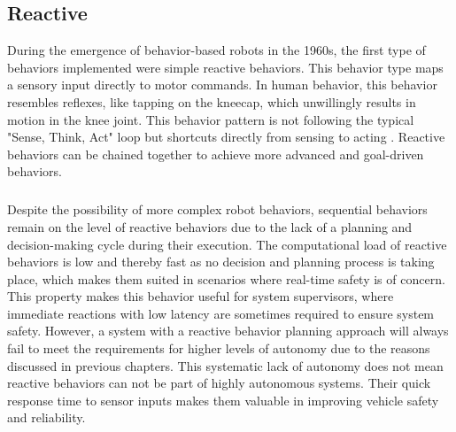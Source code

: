 \subsection{Reactive}
During the emergence of behavior-based robots in the 1960s, the first type of behaviors implemented were simple reactive behaviors. This behavior type maps a sensory input directly to motor commands. In human behavior, this behavior resembles reflexes, like tapping on the kneecap, which unwillingly results in motion in the knee joint. This behavior pattern is not following the typical "Sense, Think, Act" loop but shortcuts directly from sensing to acting \cite{desilva2008}. Reactive behaviors can be chained together to achieve more advanced and goal-driven behaviors. 
\subparagraph*{}
Despite the possibility of more complex robot behaviors, sequential behaviors remain on the level of reactive behaviors due to the lack of a planning and decision-making cycle during their execution. The computational load of reactive behaviors is low and thereby fast as no decision and planning process is taking place, which makes them suited in scenarios where real-time safety is of concern. This property makes this behavior useful for system supervisors, where immediate reactions with low latency are sometimes required to ensure system safety. However, a system with a reactive behavior planning approach will always fail to meet the requirements for higher levels of autonomy due to the reasons discussed in previous chapters. This systematic lack of autonomy does not mean reactive behaviors can not be part of highly autonomous systems. Their quick response time to sensor inputs makes them valuable in improving vehicle safety and reliability. 

